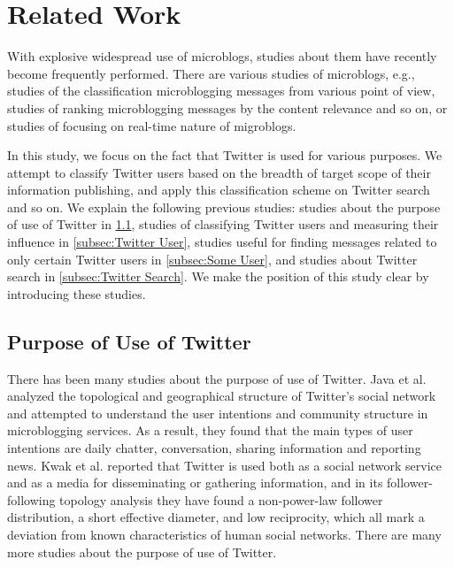 \section{Related Work}
\label{sec:Related Work}

With explosive widespread use of microblogs, studies about
them have recently become frequently performed.  There are various
studies of microblogs, e.g., studies of the
classification microblogging messages from various point of
view\cite{irani2010study}, studies of ranking microblogging messages by
the content relevance and so on\cite{duan2010empirical}, or studies of focusing on
real-time nature of migroblogs\cite{takemura2012tweet,mathioudakis2010twittermonitor}.

In this study, we focus on the fact that Twitter is used for various
purposes. We attempt to classify Twitter users based on the
breadth of target scope of their information publishing, and apply this
classification scheme on Twitter search and so on.  We explain the
following previous studies: studies about the purpose of use of
Twitter in \ref{subsec:Purpose of Use}, studies of
classifying Twitter users and measuring their influence in
\ref{subsec:Twitter User}, studies useful for finding messages related
to only certain Twitter users in \ref{subsec:Some User}, and studies
about Twitter search in \ref{subsec:Twitter Search}.
We make the position of this study clear by introducing these studies.

\subsection{Purpose of Use of Twitter}
\label{subsec:Purpose of Use}

There has been many studies about the purpose of use of Twitter. Java
et al.\cite{java2007we} analyzed the topological and
geographical structure of Twitter's social network and attempted to
understand the user intentions and community structure in microblogging
services.  As a result, they found that the main types of user
intentions are daily chatter, conversation, sharing information and
reporting news.  Kwak et al.\cite{kwak2010twitter} reported that Twitter
is used both as a social network service and as a media for
disseminating or gathering information, and in its follower-following
topology analysis they have found a non-power-law follower distribution,
a short effective diameter, and low reciprocity, which all mark a
deviation from known characteristics of human social networks.  There
are many more studies about the purpose of use of Twitter\cite{wu2011says,zhao2009and}.

